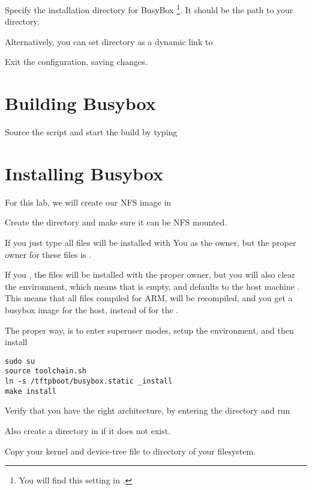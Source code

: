 Specify the installation directory for BusyBox
\footnote{You will find this setting in
.}.
It should be the path to your  directory.

Alternatively, you can set  directory as a dynamic link
to 

Exit the configuration, saving changes.

\section{Building Busybox}

Source the  script and start the build by typing 

\section{Installing Busybox}

For this lab, we will create our NFS image in 

Create the directory and make sure it can be NFS mounted.

If you just type  all files will be installed with You as the owner,
but the proper owner for these files is .

If you , the files will be installed with the proper owner,
but you will also clear the environment, which means that  is empty,
and defaults to the host machine . This means that all files compiled for ARM, 
will be recompiled, and you get a busybox image for the host, instead of for the \devboard.

The proper way, is to enter superuser modes, setup the environment, and then install

\begin{verbatim}
sudo su
source toolchain.sh
ln -s /tftpboot/busybox.static _install
make install
\end{verbatim}

Verify that you have the right architecture, by entering the 
directory and run  

Also create a  directory in  if it does not exist.

Copy your kernel and device-tree file to  directory of your filesystem.


